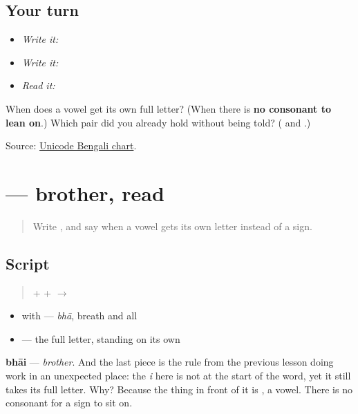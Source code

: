 \subsection*{Your turn}
\begin{itemize}
\raggedright
  \item \emph{Write it:} 
  \item \emph{Write it:}    
  \item \emph{Read it:} 
\end{itemize}

\begin{tcolorbox}[breakable,colback=teal!4,colframe=teal!35!black,title={Before you move on}]
When does a vowel get its own full letter? (When there is \textbf{no consonant to lean on}.) Which pair did you already hold without being told? (\textbf{} and \textbf{}.)

Source: \href{https://www.unicode.org/charts/PDF/U0980.pdf}{Unicode Bengali chart}.
\end{tcolorbox}
\section[bhāi]{ — brother, read}

\label{lesson:BN-W04-bhai-read}



\begin{quote}
Write \textbf{}, and say when a vowel gets its own letter instead of a sign.
\end{quote}

\subsection*{Script}
\begin{quote}
\textbf{} + \textbf{} + \textbf{} $\to$ \textbf{}
\end{quote}

\begin{itemize}
\raggedright
  \item \textbf{} with \textbf{} — \emph{bhā}, breath and all
  \item \textbf{} — the full letter, standing on its own
\end{itemize}

\textbf{bhāi} — \emph{brother}. And the last piece is the rule from the previous lesson doing work in an unexpected place: the \emph{i} here is not at the start of the word, yet it still takes its full letter. Why? Because the thing in front of it is \textbf{}, a vowel. There is no consonant for a sign to sit on.

